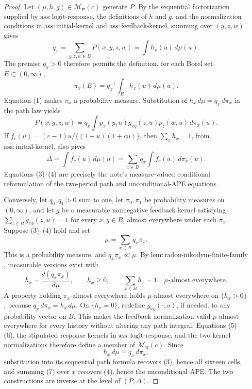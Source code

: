 \documentclass{article}
\begin{document}
\begin{proof}
Let \((\mu,h,g)\in\mathcal M_{\mathrm w}(c)\) generate \(P\).  By the sequential factorization supplied by \(\mathrm{ass{:}logit\text{-}response}\), the definitions of \(h\) and \(g\), and the normalization conditions in \(\mathrm{ass{:}initial\text{-}kernel}\) and \(\mathrm{ass{:}feedback\text{-}kernel}\), summing over \((y,z,w)\) gives
\[
 q_x=\sum_{y,z,w\in B}P(x,y,z,w)=\int h_x(u)\,d\mu(u). \tag{1}
\]
The premise \(q_x>0\) therefore permits the definition, for each Borel set \(E\subset(0,\infty)\),
\[
 \pi_x(E)=q_x^{-1}\int_E h_x(u)\,d\mu(u). \tag{2}
\]
Equation (1) makes \(\pi_x\) a probability measure.  Substitution of \(h_x\,d\mu=q_x\,d\pi_x\) in the path law yields
\[
 P(x,y,z,w)
 =q_x\int p_x(y,u)g_{xy}(z,u)p_z(w,u)\,d\pi_x(u). \tag{3}
\]
If \(f_c(u)=(c-1)u/\{(1+u)(1+cu)\}\), then \(\sum_xh_x=1\), from \(\mathrm{ass{:}initial\text{-}kernel}\), also gives
\[
 \Delta=\int f_c(u)\,d\mu(u)
 =\sum_{x\in B}q_x\int f_c(u)\,d\pi_x(u). \tag{4}
\]
Equations (3)--(4) are precisely the note's measure-valued conditional reformulation of the two-period path and unconditional-APE equations.

Conversely, let \(q_0,q_1>0\) sum to one, let \(\pi_0,\pi_1\) be probability measures on \((0,\infty)\), and let \(g\) be a measurable nonnegative feedback kernel satisfying \(\sum_{z\in B}g_{xy}(z,u)=1\) for every \(x,y\in B\), almost everywhere under each \(\pi_x\).  Suppose (3)--(4) hold and set
\[
 \mu=\sum_{x\in B}q_x\pi_x. \tag{5}
\]
This is a probability measure, and \(q_x\pi_x\ll\mu\).  By \(\mathrm{lem{:}radon\text{-}nikodym\text{-}finite\text{-}family}\), measurable versions exist with
\[
 h_x=\frac{d(q_x\pi_x)}{d\mu},
 \qquad h_x\ge0,
 \qquad \sum_{x\in B}h_x=1
 \quad\mu\text{-almost everywhere}. \tag{6}
\]
A property holding \(\pi_x\)-almost everywhere holds \(\mu\)-almost everywhere on \(\{h_x>0\}\), because \(q_x\,d\pi_x=h_x\,d\mu\).  On \(\{h_x=0\}\), redefine \(g_{xy}(\cdot,u)\), if needed, to any probability vector on \(B\).  This makes the feedback normalization valid \(\mu\)-almost everywhere for every history without altering any path integral.  Equations (5)--(6), the stipulated response kernels in \(\mathrm{ass{:}logit\text{-}response}\), and the two kernel normalizations therefore define a member of \(\mathcal M_{\mathrm w}(c)\).  Since
\[
 h_x\,d\mu=q_x\,d\pi_x, \tag{7}
\]
substitution into its sequential path formula recovers (3), hence all sixteen cells, and summing (7) over \(x\) recovers (4), hence the unconditional APE.  The two constructions are inverse at the level of \((P,\Delta)\).


\end{proof}
\end{document}
